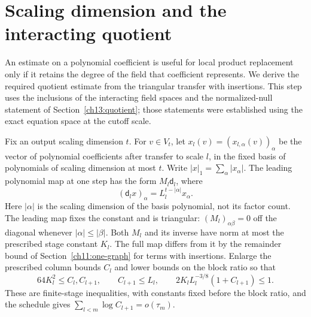 \section{Scaling dimension and the interacting quotient}
\label{ch18:graded-quotient-section}

An estimate on a polynomial coefficient is useful for local product replacement only if
it retains the degree of the field that coefficient represents.
We derive the required quotient estimate from the triangular
transfer with insertions. This step uses the inclusions of the interacting field spaces and the
normalized-null statement of Section~\ref{ch13:quotient}; those statements
were established using the exact equation space at the cutoff scale.

Fix an output scaling dimension $t$. For $v\in V_t$, let
$x_l(v)=(x_{l,\alpha}(v))_\alpha$ be the vector of polynomial coefficients
after transfer to scale $l$, in the fixed basis of polynomials of
scaling dimension at most $t$. Write $|x|_1=\sum_\alpha|x_\alpha|$. The leading polynomial map at one step has the form
$M_l\mathsf d_l$, where
\[
 (\mathsf d_lx)_\alpha=L_l^{t-|\alpha|}x_\alpha.
\]
Here $|\alpha|$ is the scaling dimension of the basis polynomial, not
its factor count. The leading map fixes the constant and is triangular:
$(M_l)_{\alpha\beta}=0$ off the diagonal whenever
$|\alpha|\le|\beta|$. Both $M_l$ and its inverse have norm at most the
prescribed stage constant $K_l$. The full map differs from it by the
remainder bound of Section~\ref{ch11:one-graph} for terms with insertions.
Enlarge the prescribed column bounds $C_l$ and lower bounds on the block ratio so that
\begin{equation}
 64K_l^2\le C_l,C_{l+1},\qquad C_{l+1}\le L_l,
 \qquad 2K_lL_l^{-3/8}(1+C_{l+1})\le1.
 \label{ch18:graded-room}
\end{equation}
These are finite-stage inequalities, with constants fixed before the
block ratio, and the schedule gives
$\sum_{l<m}\log C_{l+1}=o(\tau_m)$.


